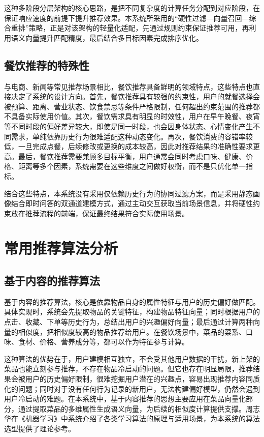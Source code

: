 这种多阶段分层架构的核心思路，是把不同复杂度的计算任务分配到对应阶段，在保证响应速度的前提下提升推荐效果。本系统所采用的“硬性过滤—向量召回—综合重排”策略，正是对该架构的轻量化适配，先通过规则约束保证推荐可用，再利用语义向量提升匹配精度，最后结合多目标因素完成排序优化。

\subsection{餐饮推荐的特殊性}
与电商、新闻等常见推荐场景相比，餐饮推荐具备鲜明的领域特点，这些特点也直接决定了系统的设计方向。首先，餐饮推荐具有较强的约束性，用户的就餐选择会被预算、距离、营业状态、饮食禁忌等条件严格限制，任何超出约束范围的推荐都不具备实际使用价值。其次，餐饮需求具有明显的时效性，用户在早午晚餐、夜宵等不同时段的偏好差异较大，即使是同一时段，也会因身体状态、心情变化产生不同需求，单纯依靠历史行为很难适配这种动态变化。再次，餐饮消费的容错率较低，一旦完成点餐，后续修改或更换的成本较高，因此对推荐结果的准确性要求更高。最后，餐饮推荐需要兼顾多目标平衡，用户通常会同时考虑口味、健康、价格、距离等多个因素，系统需要在这些维度之间做好权衡，而不是只优化单一指标。

结合这些特点，本系统没有采用仅依赖历史行为的协同过滤方案，而是采用静态画像结合即时问答的双通道建模方式，通过主动交互获取当前场景信息，并将硬性约束放在推荐流程的前端，保证最终结果符合实际使用场景。

\section{常用推荐算法分析}
\subsection{基于内容的推荐算法}
基于内容的推荐算法，核心是依靠物品自身的属性特征与用户的历史偏好做匹配。具体实现时，系统会先提取物品的关键特征，构建物品特征向量；同时根据用户的点击、收藏、下单等历史行为，总结出用户的兴趣偏好向量；最后通过计算两种向量的相似度，把相似度较高的物品推荐给用户。在餐饮场景中，菜品的菜系、口味、食材、价格、营养成分等，都可以作为特征参与计算。

这种算法的优势在于，用户建模相互独立，不会受其他用户数据的干扰，新上架的菜品也能立刻参与推荐，不存在物品冷启动的问题。但它也存在明显局限，推荐结果会被用户的历史偏好限制，很难挖掘用户潜在的兴趣点，容易出现推荐内容同质化的问题；同时对于没有任何行为记录的新用户，无法构建偏好模型，仍然会遇到用户冷启动的难题。在本系统中，基于内容推荐的思想主要应用在菜品向量化部分，通过提取菜品的多维属性生成语义向量，为后续的相似度计算提供支撑。周志华在《机器学习》中系统介绍了各类学习算法的原理与适用场景，为本系统的算法选型提供了理论参考\super{[17]}。


